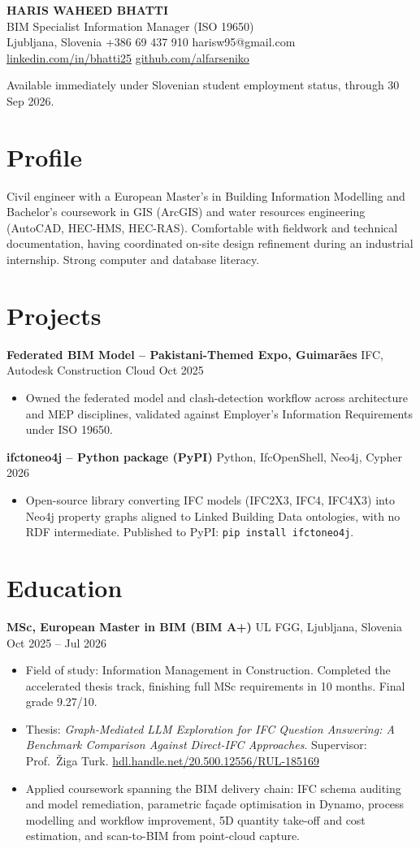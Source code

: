 \documentclass[a4paper,10.5pt]{article}
\newcommand{\datefill}{\dotfill}
\newcommand{\entry}[3]{\vspace{2.5pt}\noindent\textbf{#1} \textbar{} #2 \datefill{} #3\par\vspace{0.5pt}}
\newcommand{\ROLELINE}{BIM Specialist \textbar{} Information Manager (ISO 19650)}
\newcommand{\projIfcToNeo}{%
\entry{ifctoneo4j -- Python package (PyPI)}{Python, IfcOpenShell, Neo4j, Cypher}{2026}
\begin{itemize}
  \item Open-source library converting IFC models (IFC2X3, IFC4, IFC4X3) into Neo4j
        property graphs aligned to Linked Building Data ontologies, with no RDF
        intermediate. Published to PyPI: \texttt{pip install ifctoneo4j}.
\end{itemize}}
\newcommand{\projGuimaraes}{%
\entry{Federated BIM Model -- Pakistani-Themed Expo, Guimar\~aes}{IFC, Autodesk Construction Cloud}{Oct 2025}
\begin{itemize}
  \item Owned the federated model and clash-detection workflow across architecture
        and MEP disciplines, validated against Employer's Information Requirements
        under ISO 19650.
\end{itemize}}
\begin{document}
\begin{center}
  {\LARGE\bfseries HARIS WAHEED BHATTI}\\[2pt]
  {\large \ROLELINE}\\[3pt]
  Ljubljana, Slovenia \textbar{} +386 69 437 910 \textbar{} harisw95@gmail.com\\
  \href{https://linkedin.com/in/bhatti25}{linkedin.com/in/bhatti25} \textbar{}
  \href{https://github.com/alfarseniko}{github.com/alfarseniko}
\end{center}
\vspace{-4pt}
\noindent\small Available immediately under Slovenian student employment status, through 30 Sep 2026.\normalsize

\section{Profile}

\noindent Civil engineer with a European Master's in Building Information Modelling and
Bachelor's coursework in GIS (ArcGIS) and water resources engineering (AutoCAD,
HEC-HMS, HEC-RAS). Comfortable with fieldwork and technical documentation, having
coordinated on-site design refinement during an industrial internship. Strong
computer and database literacy.

\section{Projects}

 \projGuimaraes \projIfcToNeo

\section{Education}
\entry{MSc, European Master in BIM (BIM A+)}{UL FGG, Ljubljana, Slovenia}{Oct 2025 -- Jul 2026}
\begin{itemize}
  \item Field of study: Information Management in Construction. Completed the
        accelerated thesis track, finishing full MSc requirements in 10 months.
        Final grade 9.27/10.
  \item Thesis: \textit{Graph-Mediated LLM Exploration for IFC Question Answering:
        A Benchmark Comparison Against Direct-IFC Approaches}. Supervisor:
        Prof.~\v{Z}iga Turk. \href{http://hdl.handle.net/20.500.12556/RUL-185169}{hdl.handle.net/20.500.12556/RUL-185169}
  \item Applied coursework spanning the BIM delivery chain: IFC schema auditing and model remediation, parametric façade optimisation in Dynamo, process modelling and workflow improvement, 5D quantity take-off and cost estimation, and scan-to-BIM from point-cloud capture.
\end{itemize}
\end{document}
